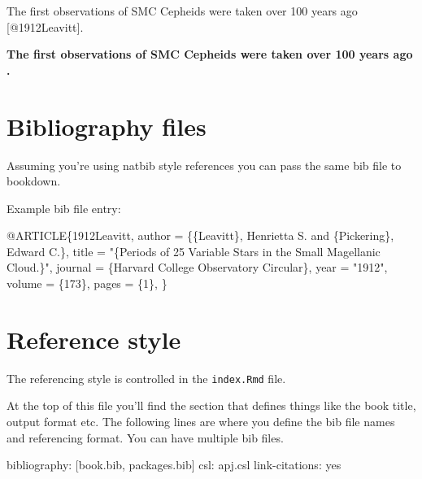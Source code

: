 \documentclass[]{book}
\newenvironment{Shaded}{\begin{snugshade}}{\end{snugshade}}
\newcommand{\BaseNTok}[1]{\textcolor[rgb]{0.00,0.00,0.81}{#1}}
\newcommand{\NormalTok}[1]{#1}
\begin{document}
\begin{Shaded}
\begin{Highlighting}[]
\NormalTok{The first observations of SMC Cepheids were taken over 100 years ago [@1912Leavitt].}
\end{Highlighting}
\end{Shaded}

\textbf{The first observations of SMC Cepheids were taken over 100 years ago \citep{1912Leavitt}.}

\hypertarget{sec:bib-files}{%
\section{Bibliography files}\label{sec:bib-files}}

Assuming you're using natbib style references you can pass the same bib file to bookdown.

Example bib file entry:

\begin{Shaded}
\begin{Highlighting}[]
\NormalTok{@ARTICLE\{1912Leavitt,}
\BaseNTok{       author = \{\{Leavitt\}, Henrietta S. and \{Pickering\}, Edward C.\},}
\BaseNTok{        title = "\{Periods of 25 Variable Stars in the Small Magellanic Cloud.\}",}
\BaseNTok{      journal = \{Harvard College Observatory Circular\},}
\BaseNTok{         year = "1912",}
\BaseNTok{       volume = \{173\},}
\BaseNTok{        pages = \{1\},}
\NormalTok{\}}
\end{Highlighting}
\end{Shaded}

\hypertarget{sec:ref-style}{%
\section{Reference style}\label{sec:ref-style}}

The referencing style is controlled in the \texttt{index.Rmd} file.

At the top of this file you'll find the section that defines things like the book title, output format etc. The following lines are where you define the bib file names and referencing format. You can have multiple bib files.

\begin{Shaded}
\begin{Highlighting}[]
\NormalTok{bibliography: [book.bib, packages.bib]}
\NormalTok{csl: apj.csl}
\NormalTok{link-citations: yes}
\end{Highlighting}
\end{Shaded}
\end{document}
